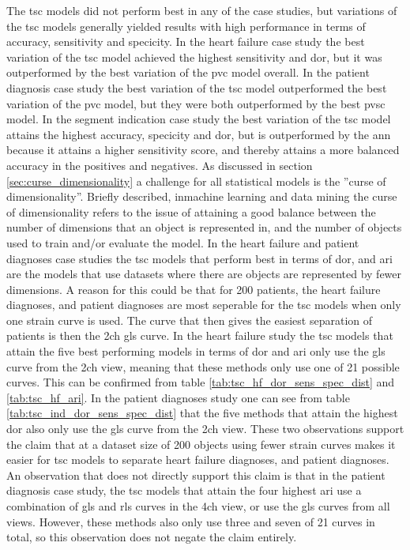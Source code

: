 The \acrshort{tsc} models did not perform best in any of the case studies, but variations of the \acrshort{tsc} models generally yielded results with high performance in terms of accuracy, sensitivity and specicity. In the heart failure case study the best variation of the \acrshort{tsc} model achieved the highest sensitivity and \acrshort{dor}, but it was outperformed by the best variation of the \acrshort{pvc} model overall. In the patient diagnosis case study the best variation of the \acrshort{tsc} model outperformed the best variation of the \acrshort{pvc} model, but they were both outperformed by the best \acrshort{pvsc} model. In the segment indication case study the best variation of the \acrshort{tsc} model attains the highest accuracy, specicity and \acrshort{dor}, but is outperformed by the \acrshort{ann} because it attains a higher sensitivity score, and thereby attains a more balanced accuracy in the positives and negatives. \bigskip
As discussed in section \ref{sec:curse_dimensionality} a challenge for all statistical models is the ''curse of dimensionality''. Briefly described, inmachine learning and data mining the curse of dimensionality refers to the issue of attaining a good balance between the number of dimensions that an object is represented in, and the number of objects used to train and/or evaluate the model. In the heart failure and patient diagnoses case studies the \acrshort{tsc} models that perform best in terms of \acrshort{dor}, and \acrshort{ari} are the models that use datasets where there are objects are represented by fewer dimensions. A reason for this could be that for 200 patients, the heart failure diagnoses, and patient diagnoses are most seperable for the \acrshort{tsc} models when only one strain curve is used. The curve that then gives the easiest separation of patients is then the \acrshort{2ch} \acrshort{gls} curve. In the heart failure study the \acrshort{tsc} models that attain the five best performing models in terms of \acrshort{dor} and \acrshort{ari} only use the \acrshort{gls} curve from the \acrshort{2ch} view, meaning that these methods only use one of 21 possible curves. This can be confirmed from table \ref{tab:tsc_hf_dor_sens_spec_dist} and \ref{tab:tsc_hf_ari}. In the patient diagnoses study one can see from table \ref{tab:tsc_ind_dor_sens_spec_dist} that the five methods that attain the highest \acrshort{dor} also only use the \acrshort{gls} curve from the \acrshort{2ch} view. These two observations support the claim that at a dataset size of 200 objects using fewer strain curves makes it easier for \acrshort{tsc} models to separate heart failure diagnoses, and patient diagnoses. An observation that does not directly support this claim is that in the patient diagnosis case study, the \acrshort{tsc} models that attain the four highest \acrshort{ari} use a combination of \acrshort{gls} and \acrshort{rls} curves in the \acrshort{4ch} view, or use the \acrshort{gls} curves from all views. However, these methods also only use three and seven of 21 curves in total, so this observation does not negate the claim entirely. \bigskip
